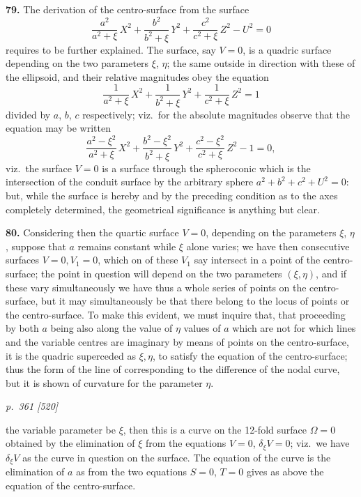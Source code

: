 \documentclass[11pt,a4paper]{book}
\begin{document}
\textbf{79.} The derivation of the centro-surface from the surface
\[
\frac{a^2}{a^2 + \xi}\,X^2 + \frac{b^2}{b^2 + \xi}\,Y^2 + \frac{c^2}{c^2 + \xi}\,Z^2 - U^2 = 0
\]
requires to be further explained. The surface, say $V = 0$, is a quadric surface depending on the two parameters $\xi$, $\eta$; the same outside in direction with these of the ellipsoid, and their relative magnitudes obey the equation
\[
\frac{1}{a^2 + \xi}\,X^2 + \frac{1}{b^2 + \xi}\,Y^2 + \frac{1}{c^2 + \xi}\,Z^2 = 1
\]
divided by $a$, $b$, $c$ respectively; viz.\ for the absolute magnitudes observe that the equation may be written
\[
\frac{a^2 - \xi^2}{a^2 + \xi}\,X^2 + \frac{b^2 - \xi^2}{b^2 + \xi}\,Y^2 + \frac{c^2 - \xi^2}{c^2 + \xi}\,Z^2 - 1 = 0,
\]
viz.\ the surface $V = 0$ is a surface through the spheroconic which is the intersection of the conduit surface by the arbitrary sphere $a^2 + b^2 + c^2 + U^2 = 0$: but, while the surface is hereby and by the preceding condition as to the axes completely determined, the geometrical significance is anything but clear.

\textbf{80.} Considering then the quartic surface $V = 0$, depending on the parameters $\xi$, $\eta$, suppose that $a$ remains constant while $\xi$ alone varies; we have then consecutive surfaces $V = 0, V_1 = 0$, which on of these $V_1$ say intersect in a point of the centro-surface; the point in question will depend on the two parameters $(\xi, \eta)$, and if these vary simultaneously we have thus a whole series of points on the centro-surface, but it may simultaneously be that there belong to the locus of points or the centro-surface. To make this evident, we must inquire that, that proceeding by both $a$ being also along the value of $\eta$ values of $a$ which are not for which lines and the variable centres are imaginary by means of points on the centro-surface, it is the quadric superceded as $\xi, \eta$, to satisfy the equation of the centro-surface; thus the form of the line of corresponding to the difference of the nodal curve, but it is shown of curvature for the parameter $\eta$.

\clearpage

\bigskip
\textit{p.~361 [520]}
\smallskip

the variable parameter be $\xi$, then this is a curve on the 12-fold surface $\Omega = 0$ obtained by the elimination of $\xi$ from the equations $V = 0$, $\delta_\xi V = 0$; viz.\ we have $\delta_\xi V$ as the curve in question on the surface. The equation of the curve is the elimination of $a$ as from the two equations $S = 0$, $T = 0$ gives as above the equation of the centro-surface.
\end{document}
